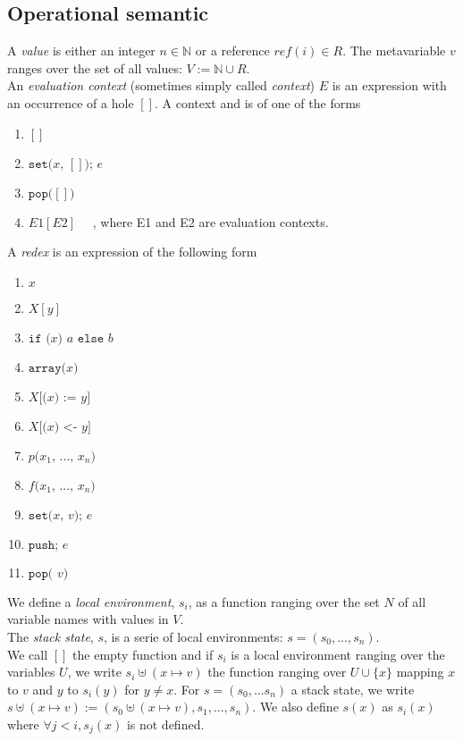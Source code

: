 \documentclass[12pt,a4paper]{article}
\newcommand{\cl}[1]{\texttt{#1}}
\newcommand{\N}{\mathbb{N}}
\newcommand{\econt}[1]{[#1]}
\begin{document}
\subsection{Operational semantic}

A \emph{value} is either an integer $n \in \N$ or a reference $ref(i) \in R$. The metavariable $v$ ranges over the set of all values: $V := \N \cup R$.\\

An \emph{evaluation context} (sometimes simply called \emph{context}) $E$ is an expression with an occurrence of a hole $\econt{}$. A context  and is of one of the forms
\begin{enumerate}
\itemsep-0.2em
\item $\econt{}$
\item $\cl{set(} x \cl{, } \econt{} \cl{); } e $
\item $\cl{pop(} \econt{} \cl{)}$
\item $E1\econt{E2}$ \ \ , where E1 and E2 are evaluation contexts.
\end{enumerate}

A \emph{redex} is an expression of the following form
\begin{enumerate}
\itemsep-0.2em
\item $x$
\item $X[y]$
\item $\cl{if (} x \cl{) } a \cl{ else } b $
\item $\cl{array(} x \cl{)}$
\item $X\cl{[(} x \cl{) := } y \cl{]}$
\item $X\cl{[(} x \cl{) <- } y \cl{]}$
\item $p\cl{(} x_1 \cl{, } ... \cl{, } x_n \cl{)}$
\item $f\cl{(} x_1 \cl{, } ... \cl{, } x_n \cl{)}$
\item $\cl{set(} x \cl{, } v \cl{); } e$
\item $\cl{push; } e$
\item $\cl{pop( } v \cl{)}$
\end{enumerate}

We define a \emph{local environment}, $s_i$, as a function ranging over the set $N$ of all variable names with values in $V$.\\
The \emph{stack state}, $s$, is a serie of local environments: $s = (s_0, ... , s_n)$.\\
We call $[]$ the empty function and if $s_i$ is a local environment ranging over the variables $U$, we write $s_i \uplus (x \mapsto v)$ the function ranging over $U \cup \{x\}$ mapping $x$ to $v$ and $y$ to $s_i(y)$ for $y \neq x$. For $s = (s_0, ... s_n)$ a stack state, we write $s \uplus (x \mapsto v) := \left( s_0 \uplus (x \mapsto v), s_1, ... , s_n \right)$. We also define $s(x)$ as $s_i(x)$ where $\forall j < i, s_j(x)$ is not defined.
\end{document}
